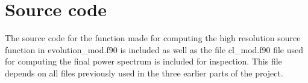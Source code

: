 \documentclass[a4paper]{report}
\begin{document}
\onecolumn 
\section{Source code}\label{sec:files}
The source code for the function made for computing the high resolution source function in evolution\_mod.f90 is included as well as the file cl\_mod.f90 file used for computing the final power spectrum is included for inspection. This file depends on all files previously used in the three earlier parts of the project.



\end{document}
